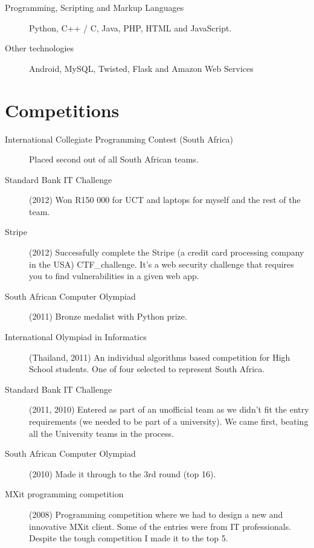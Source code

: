 \documentclass[margin,line,a4paper]{resume}
\begin{document}
\begin{resume}
\begin{description}
                \item [Programming, Scripting and Markup Languages] Python, C++ / C, Java, PHP, HTML and JavaScript.

                \item [Other technologies] Android, MySQL, Twisted, Flask and Amazon Web Services
            \end{description}

        \section{\mysidestyle Competitions}
            \begin{description}
                \item [International Collegiate Programming Contest (South Africa)] Placed second out of all South African teams.
                \item [Standard Bank IT Challenge] (2012) Won R150 000 for UCT and laptops for myself and the rest of the team.
                \item [Stripe] (2012) Successfully complete the Stripe (a credit card processing company in the USA) CTF_challenge. 
                    It's a web security challenge that requires you to find vulnerabilities in a given web app.

                \item [South African Computer Olympiad] (2011) Bronze medalist with Python prize.

                \item [International Olympiad in Informatics] (Thailand, 2011) An individual 
                algorithms based competition for High School students. One of four selected
                to represent South Africa.

                \item [Standard Bank IT Challenge] (2011, 2010) Entered as part of an unofficial team
                as we didn't fit the entry requirements (we needed to be part of a university).
                We came first, beating all the University teams in the process.

                \item [South African Computer Olympiad] (2010) Made it through to the 3rd
                round (top 16).

                \item [MXit programming competition] (2008) Programming competition where we
                had to design a new and innovative MXit client.  Some of the
                entries were from IT professionals. Despite the tough competition I made it to the top 5.
            \end{description}


\end{resume}
\end{document}

